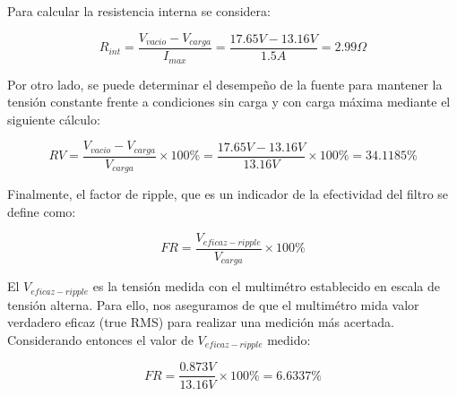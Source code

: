 \documentclass[chaptersright]{informeutn}
\begin{document}
        Para calcular la resistencia interna se considera:

        \begin{equation}
            R_{int} = \frac{V_{vacio} - V_{carga}}{I_{max}}= \frac{17.65V - 13.16V}{1.5A} = 2.99\Omega
        \end{equation}

        Por otro lado, se puede determinar el desempeño de la fuente para mantener la tensión constante frente a
        condiciones sin carga y con carga máxima mediante el siguiente cálculo:

        \begin{equation}
            RV = \frac{V_{vacio} -V_{carga}}{V_{carga}} \times 100\% = \frac{17.65V-13.16V}{13.16V} \times 100\% = 34.1185\%
        \end{equation}
        
        Finalmente, el factor de ripple, que es un indicador de la efectividad del filtro se define como:

        \begin{equation}
            FR = \frac{V_{eficaz-ripple}}{V_{carga}} \times 100\%
        \end{equation}

        El $V_{eficaz-ripple}$ es la tensión medida con el multimétro establecido en escala de tensión alterna.
        Para ello, nos aseguramos de que el multimétro mida valor verdadero eficaz (true RMS) para realizar una
        medición más acertada. Considerando entonces el valor de $V_{eficaz-ripple}$ medido:

        \begin{equation}
            FR = \frac{0.873V}{13.16V} \times 100\% = 6.6337\%
        \end{equation}
\end{document}
